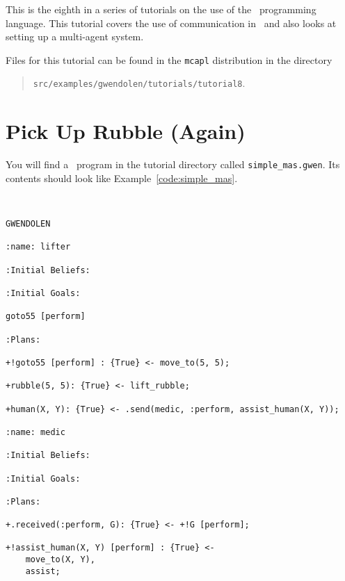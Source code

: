 \label{tutorial:gwendolen:communication}
This is the eighth in a series of tutorials on the use of the \gwendolen\ programming language.  This tutorial covers the use of communication in \gwendolen\ and also looks at setting up a multi-agent system.

Files for this tutorial can be found in the \texttt{mcapl} distribution in the directory 
\begin{quote}
\texttt{src/examples/gwendolen/tutorials/tutorial8}.
\end{quote}

\section{Pick Up Rubble (Again)}

\begin{sloppypar}
You will find a \gwendolen\ program in the tutorial directory called \texttt{simple\_mas.gwen}.  Its contents should look like Example~\ref{code:simple_mas}.
\end{sloppypar}
\begin{ourexample}
\label{code:simple_mas} \quad \\
\begin{lstlisting}[basicstyle=\sffamily,style=easslisting,language=Gwendolen]
GWENDOLEN

:name: lifter

:Initial Beliefs:

:Initial Goals:

goto55 [perform]

:Plans:

+!goto55 [perform] : {True} <- move_to(5, 5);

+rubble(5, 5): {True} <- lift_rubble;

+human(X, Y): {True} <- .send(medic, :perform, assist_human(X, Y));

:name: medic

:Initial Beliefs:

:Initial Goals:

:Plans:

+.received(:perform, G): {True} <- +!G [perform];

+!assist_human(X, Y) [perform] : {True} <- 
	move_to(X, Y),
	assist;
\end{lstlisting}
\end{ourexample}


